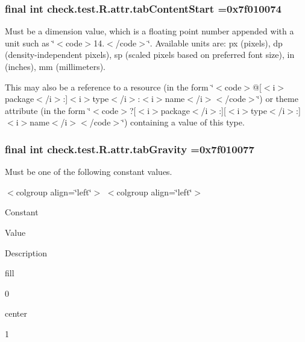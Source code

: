 \subsubsection[{tab\+Content\+Start}]{\setlength{\rightskip}{0pt plus 5cm}final int check.\+test.\+R.\+attr.\+tab\+Content\+Start =0x7f010074\hspace{0.3cm}{\ttfamily [static]}}\label{classcheck_1_1test_1_1_r_1_1attr_af4fc4df4ea303d1145e27e9279ff4f2e}
Must be a dimension value, which is a floating point number appended with a unit such as \char`\"{}$<$code$>$14.\+5sp$<$/code$>$\char`\"{}. Available units are\+: px (pixels), dp (density-\/independent pixels), sp (scaled pixels based on preferred font size), in (inches), mm (millimeters). 

This may also be a reference to a resource (in the form \char`\"{}$<$code$>$@\mbox{[}$<$i$>$package$<$/i$>$\+:\mbox{]}$<$i$>$type$<$/i$>$\+:$<$i$>$name$<$/i$>$$<$/code$>$\char`\"{}) or theme attribute (in the form \char`\"{}$<$code$>$?\mbox{[}$<$i$>$package$<$/i$>$\+:\mbox{]}\mbox{[}$<$i$>$type$<$/i$>$\+:\mbox{]}$<$i$>$name$<$/i$>$$<$/code$>$\char`\"{}) containing a value of this type. \hypertarget{classcheck_1_1test_1_1_r_1_1attr_aa338d973c780b029f86890fee9cdcd55}{}
\subsubsection[{tab\+Gravity}]{\setlength{\rightskip}{0pt plus 5cm}final int check.\+test.\+R.\+attr.\+tab\+Gravity =0x7f010077\hspace{0.3cm}{\ttfamily [static]}}\label{classcheck_1_1test_1_1_r_1_1attr_aa338d973c780b029f86890fee9cdcd55}
Must be one of the following constant values.

\begin{TabularC}{0}
\hline
\end{TabularC}
$<$colgroup align=\char`\"{}left\char`\"{}$>$ $<$colgroup align=\char`\"{}left\char`\"{}$>$ 

Constant

Value

Description 

{\ttfamily fill}

0

{\ttfamily center}

1\hypertarget{classcheck_1_1test_1_1_r_1_1attr_a7c3852dcc199564747fe365fccae05f5}{}
